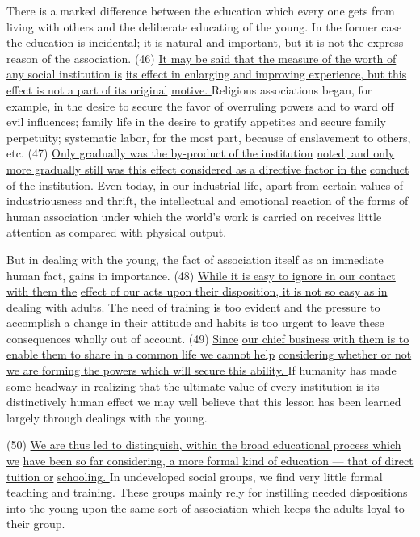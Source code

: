 \documentclass[UTF8,11pt]{ctexart}
\begin{document}
There is a marked difference between the education which every one gets from living with others and the deliberate educating of the young. In the former case the education is incidental; it is natural and important, but it is not the express reason of the association. (46) \uline{It may be said that the measure of the worth of any social institution is} \uline{its effect in enlarging and improving experience, but this effect is not a part of its original} \uline{motive. }Religious associations began, for example, in the desire to secure the favor of overruling powers and to ward off evil influences; family life in the desire to gratify appetites and secure family perpetuity; systematic labor, for the most part, because of enslavement to others, etc. (47) \uline{Only gradually was the by-product of the institution} \uline{noted, and only more gradually still was this effect considered as a directive factor in the} \uline{conduct of the institution. }Even today, in our industrial life, apart from certain values of industriousness and thrift, the intellectual and emotional reaction of the forms of human association under which the world’s work is carried on receives little attention as compared with physical output.


But in dealing with the young, the fact of association itself as an immediate human fact, gains in importance. (48) \uline{While it is easy to ignore in our contact with them the} \uline{effect of our acts upon their disposition, it is not so easy as in dealing with adults. }The need of training is too evident and the pressure to accomplish a change in their attitude and habits is too urgent to leave these consequences wholly out of account. (49) \uline{Since} \uline{our chief business with them is to enable them to share in a common life we cannot help} \uline{considering whether or not we are forming the powers which will secure this ability. }If humanity has made some headway in realizing that the ultimate value of every institution is its distinctively human effect we may well believe that this lesson has been learned largely through dealings with the young.


(50) \uline{We are thus led to distinguish, within the broad educational process which we} \uline{have been so far considering, a more formal kind of education — that of direct tuition or} \uline{schooling. }In undeveloped social groups, we find very little formal teaching and training. These groups mainly rely for instilling needed dispositions into the young upon the same sort of association which keeps the adults loyal to their group.
\end{document}
